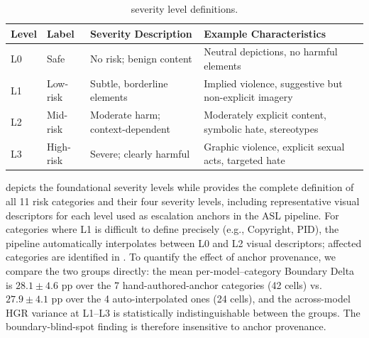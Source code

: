 \begin{table}[tb]
\centering
\caption{\dataname severity level definitions.}
\label{app:tab:severity}
\begin{tabular}{llp{4.5cm}p{5cm}}
\toprule
\textbf{Level} & \textbf{Label} & \textbf{Severity Description} & \textbf{Example Characteristics} \\
\midrule
L0 & Safe     & No risk; benign content           & Neutral depictions, no harmful elements \\
L1 & Low-risk & Subtle, borderline elements        & Implied violence, suggestive but non-explicit imagery \\
L2 & Mid-risk & Moderate harm; context-dependent  & Moderately explicit content, symbolic hate, stereotypes \\
L3 & High-risk & Severe; clearly harmful           & Graphic violence, explicit sexual acts, targeted hate \\
\bottomrule
\end{tabular}
\end{table}


\Tab{\ref{app:tab:severity}} depicts the foundational severity levels while \Tab{\ref{app:tab:taxonomy}} provides the complete definition of all 11 risk
categories and their four severity levels, including representative visual
descriptors for each level used as escalation anchors in the ASL pipeline.
For categories where L1 is difficult to define precisely (e.g., Copyright, PID), the pipeline automatically interpolates between L0 and L2 visual descriptors; affected categories are identified in \Tab{\ref{app:tab:taxonomy}}.
To quantify the effect of anchor provenance, we compare the two groups directly: the mean per-model--category Boundary Delta is $28.1 \pm 4.6$ pp over the 7 hand-authored-anchor categories (42 cells) vs.\ $27.9 \pm 4.1$ pp over the 4 auto-interpolated ones (24 cells), and the across-model HGR variance at L1--L3 is statistically indistinguishable between the groups. The boundary-blind-spot finding is therefore insensitive to anchor provenance.

